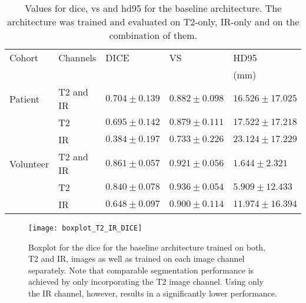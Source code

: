 \begin{table}[htbp]
   \centering
   \caption[Results for Feasibility]{Values for \acrlong{dice}, \acrlong{vs} and \acrlong{hd95} for the baseline architecture. The architecture was trained and evaluated on T2-only, IR-only and on the combination of them.}
   \begin{tabular}{l*{4}{l}}
      \toprule
      Cohort	& Channels  & DICE              & VS				& HD95\\
      			&			&					&					& (mm)\\
      \midrule
      Patient   & T2 and IR & $\mathbf{0.704 \pm 0.139}$& $\mathbf{0.882 \pm 0.098}$ & $\mathbf{16.526 \pm 17.025}$ \\
                & T2        & $0.695 \pm 0.142 $& $0.879 \pm 0.111$ & $ 17.522 \pm 17.218$ \\
                & IR        & $0.384 \pm 0.197 $& $0.733 \pm 0.226$ & $ 23.124 \pm 17.229$ \\
      \midrule
      Volunteer & T2 and IR & $\mathbf{0.861 \pm 0.057 }$& $0.921 \pm 0.056$ & $\mathbf{1.644 \pm 2.321}$ \\
                & T2        & $0.840 \pm 0.078 $& $\mathbf{0.936 \pm 0.054}$ & $ 5.909 \pm 12.433$ \\
                & IR        & $0.648 \pm 0.097 $& $0.900 \pm 0.114$ & $ 11.974 \pm 16.394$ \\
      \bottomrule
   \end{tabular}
   \label{tab:results_feasibility}
\end{table}

\begin{figure}[htbp]
	\centering
	\texttt{[image: boxplot\_T2\_IR\_DICE]}
    \caption[Boxplot for the \acrlong{dice} for the Baseline Architecture]{Boxplot for the \acrlong{dice} for the baseline architecture trained on both, T2 and IR, images as well as trained on each image channel separately. Note that comparable segmentation performance is achieved by only incorporating the T2 image channel. Using only the IR channel, however, results in a significantly lower performance.}
    \label{fig:results_boxplot_T2_IR_dice}
\end{figure}

